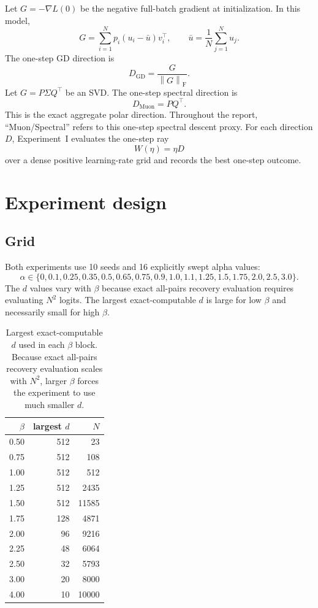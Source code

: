 \documentclass[11pt]{article}
\newcommand{\norm}[1]{\left\lVert #1 \right\rVert}
\newcommand{\F}{\mathrm{F}}
\newcommand{\Muon}{\mathrm{Muon}}
\newcommand{\GD}{\mathrm{GD}}
\begin{document}
Let $G=-\nabla L(0)$ be the negative full-batch gradient at initialization.
In this model,
\[
  G=\sum_{i=1}^N p_i(u_i-\bar u)v_i^\top,
  \qquad
  \bar u=\frac1N\sum_{j=1}^Nu_j .
\]
The one-step GD direction is
\[
  D_{\GD}=\frac{G}{\norm{G}_{\F}}.
\]
Let $G=P\Sigma Q^\top$ be an SVD.  The one-step spectral direction is
\[
  D_{\Muon}=PQ^\top .
\]
This is the exact aggregate polar direction.  Throughout the report,
``Muon/Spectral'' refers to this one-step spectral descent proxy.  For each
direction $D$, Experiment~I evaluates the one-step ray
\[
  W(\eta)=\eta D
\]
over a dense positive learning-rate grid and records the best one-step
outcome.

\section{Experiment design}

\subsection{Grid}

Both experiments use 10 seeds and 16 explicitly swept alpha values:
\[
  \alpha\in
  \{0,0.1,0.25,0.35,0.5,0.65,0.75,0.9,
  1.0,1.1,1.25,1.5,1.75,2.0,2.5,3.0\}.
\]
The $d$ values vary with $\beta$ because exact all-pairs recovery evaluation
requires evaluating $N^2$ logits.  The largest exact-computable $d$ is large
for low $\beta$ and necessarily small for high $\beta$.

\begin{table}[H]
\centering
\caption{Largest exact-computable $d$ used in each $\beta$ block.  Because
exact all-pairs recovery evaluation scales with $N^2$, larger $\beta$ forces
the experiment to use much smaller $d$.}
\small
\begin{tabular}{rrr}
\toprule
$\beta$ & largest $d$ & $N$ \\
\midrule
0.50 & 512 & 23 \\
0.75 & 512 & 108 \\
1.00 & 512 & 512 \\
1.25 & 512 & 2435 \\
1.50 & 512 & 11585 \\
1.75 & 128 & 4871 \\
2.00 & 96 & 9216 \\
2.25 & 48 & 6064 \\
2.50 & 32 & 5793 \\
3.00 & 20 & 8000 \\
4.00 & 10 & 10000 \\
\bottomrule
\end{tabular}
\label{tab:grid-d-limits}
\end{table}
\end{document}
